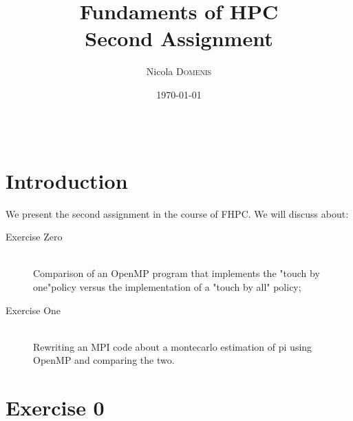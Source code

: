 \documentclass{article}
\title{Fundaments of HPC \\ Second Assignment} %
\author{Nicola \textsc{Domenis}} %
\date{\today} %
\begin{document}
\maketitle %

\begin{center}
\begin{tabular}{l r}

\end{tabular}
\end{center}



\section{Introduction}

We present the second assignment in the course of FHPC. We will discuss about:


\begin{description}
\item[Exercise Zero] \hfill \\
Comparison of an OpenMP program that implements the "touch by one"policy versus the implementation of a "touch by all" policy;
\item[Exercise One] \hfill \\
Rewriting an MPI code about a montecarlo estimation of pi using OpenMP and comparing the two.

\end{description} 
 

\section{Exercise 0}
\end{document}
